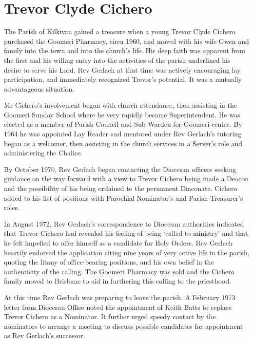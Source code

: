 \hypertarget{trevor-clyde-cichero}{%
\section{Trevor Clyde Cichero}\label{trevor-clyde-cichero}}

The Parish of Kilkivan gained a treasure when a young Trevor Clyde Cichero purchased the Goomeri Pharmacy, circa 1960, and moved with his wife Gwen and family into the town and into the church's life. His deep faith was apparent from the first and his willing entry into the activities of the parish underlined his desire to serve his Lord. Rev Gerlach at that time was actively encouraging lay participation, and immediately recognized Trevor's potential. It was a mutually advantageous situation.

Mr Cichero's involvement began with church attendance, then assisting in the Goomeri Sunday School where he very rapidly became Superintendent. He was elected as a member of Parish Council and Sub-Warden for Goomeri centre. By 1964 he was appointed Lay Reader and mentored under Rev Gerlach's tutoring began as a welcomer, then assisting in the church services in a Server's role and administering the Chalice.

By October 1970, Rev Gerlach began contacting the Diocesan officers seeking guidance on the way forward with a view to Trevor Cichero being made a Deacon and the possibility of his being ordained to the permanent Diaconate. Cichero added to his list of positions with Parochial Nominator's and Parish Treasurer's roles.

In August 1972, Rev Gerlach's correspondence to Diocesan authorities indicated that Trevor Cichero had revealed his feeling of being `called to ministry' and that he felt impelled to offer himself as a candidate for Holy Orders. Rev Gerlach heartily endorsed the application citing nine years of very active life in the parish, quoting the litany of office-bearing positions, and his own belief in the authenticity of the calling. The Goomeri Pharmacy was sold and the Cichero family moved to Brisbane to aid in furthering this calling to the priesthood.

At this time Rev Gerlach was preparing to leave the parish. A February 1973 letter from Diocesan Office noted the appointment of Keith Batts to replace Trevor Cichero as a Nominator. It further urged speedy contact by the nominators to arrange a meeting to discuss possible candidates for appointment as Rev Gerlach's successor.

